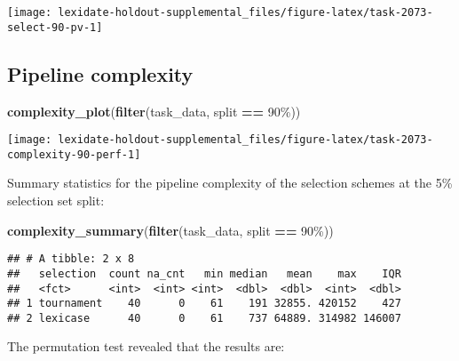 \documentclass[
]{book}
\newenvironment{Shaded}{\begin{snugshade}}{\end{snugshade}}
\newcommand{\FunctionTok}[1]{\textcolor[rgb]{0.13,0.29,0.53}{\textbf{#1}}}
\newcommand{\NormalTok}[1]{#1}
\newcommand{\SpecialCharTok}[1]{\textcolor[rgb]{0.81,0.36,0.00}{\textbf{#1}}}
\newcommand{\StringTok}[1]{\textcolor[rgb]{0.31,0.60,0.02}{#1}}
\begin{document}
\texttt{[image: lexidate-holdout-supplemental\_files/figure-latex/task-2073-select-90-pv-1]}

\hypertarget{pipeline-complexity-41}{%
\subsection{Pipeline complexity}\label{pipeline-complexity-41}}

\begin{Shaded}
\begin{Highlighting}[]
\FunctionTok{complexity\_plot}\NormalTok{(}\FunctionTok{filter}\NormalTok{(task\_data, split }\SpecialCharTok{==} \StringTok{\textquotesingle{}90\%\textquotesingle{}}\NormalTok{))}
\end{Highlighting}
\end{Shaded}

\texttt{[image: lexidate-holdout-supplemental\_files/figure-latex/task-2073-complexity-90-perf-1]}

Summary statistics for the pipeline complexity of the selection schemes at the 5\% selection set split:

\begin{Shaded}
\begin{Highlighting}[]
\FunctionTok{complexity\_summary}\NormalTok{(}\FunctionTok{filter}\NormalTok{(task\_data, split }\SpecialCharTok{==} \StringTok{\textquotesingle{}90\%\textquotesingle{}}\NormalTok{))}
\end{Highlighting}
\end{Shaded}

\begin{verbatim}
## # A tibble: 2 x 8
##   selection  count na_cnt   min median   mean    max    IQR
##   <fct>      <int>  <int> <int>  <dbl>  <dbl>  <int>  <dbl>
## 1 tournament    40      0    61    191 32855. 420152    427
## 2 lexicase      40      0    61    737 64889. 314982 146007
\end{verbatim}

The permutation test revealed that the results are:
\end{document}
